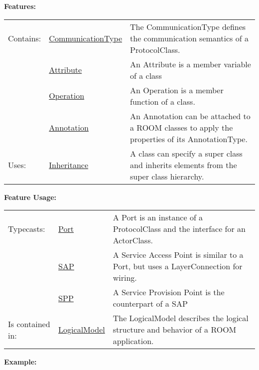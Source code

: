 		
	\begingroup
	\textbf{Features:}
	\renewcommand{\arraystretch}{1.8} %
	\begin{longtable}{l|l p{}}
		\hline
	Contains: & \tabitem \hyperlink{ref:CommunicationType}{CommunicationType}  & The CommunicationType defines the communication semantics of a ProtocolClass.\\
	& \tabitem \hyperlink{ref:Attribute}{Attribute}  & An Attribute is a member variable of a class \\
	& \tabitem \hyperlink{ref:Operation}{Operation}  & An Operation is a member function of a class. \\
	& \tabitem \hyperlink{ref:Annotation}{Annotation}  & An Annotation can be attached to a ROOM classes to apply the properties of its AnnotationType. \\
	\hline
	Uses: & \tabitem \hyperlink{ref:Inheritance}{Inheritance}  & A class can specify a super class and inherits elements from the super class hierarchy.\\
	\hline
	\end{longtable}
	\endgroup
		
	\begingroup
	\textbf{Feature Usage:}
	\renewcommand{\arraystretch}{1.8} %
	\begin{longtable}{l|l p{}}
		\hline
	Typecasts: & \tabitem \hyperlink{ref:Port}{Port}  & A Port is an instance of a ProtocolClass and the interface for an ActorClass.\\
	& \tabitem \hyperlink{ref:SAP}{SAP}  & A Service Access Point is similar to a Port, but uses a LayerConnection for wiring. \\
	& \tabitem \hyperlink{ref:SPP}{SPP}  & A Service Provision Point is the counterpart of a SAP \\
	\hline
	Is contained in: & \tabitem \hyperlink{ref:LogicalModel}{LogicalModel}  & The LogicalModel describes the logical structure and behavior of a ROOM application.\\
	\hline
	\end{longtable}
	\endgroup
		
	\textbf{Example:}
	
